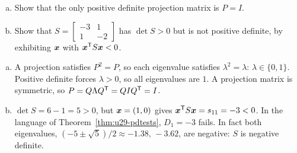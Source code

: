 \begin{exercise}\label{exr:u29-projection}
\begin{enumerate}[(a)]
  \item Show that the only positive definite projection matrix is $P=I$.
  \item Show that $S=\left[\begin{smallmatrix}-3&1\\1&-2\end{smallmatrix}\right]$ has $\det S>0$ but is not
        positive definite, by exhibiting $\boldsymbol{x}$ with $\boldsymbol{x}^{\mathsf{T}} S\boldsymbol{x}<0$.
\end{enumerate}
\end{exercise}
\begin{solution}
\begin{enumerate}[(a)]
  \item A projection satisfies $P^2=P$, so each eigenvalue satisfies $\lambda^2=\lambda$: $\lambda\in\{0,1\}$.
        Positive definite forces $\lambda>0$, so all eigenvalues are $1$. A projection matrix is
        symmetric, so $P=Q\Lambda Q^{\mathsf{T}}=QIQ^{\mathsf{T}}=I$.
  \item $\det S=6-1=5>0$, but $\boldsymbol{x}=(1,0)$ gives $\boldsymbol{x}^{\mathsf{T}} S\boldsymbol{x}=s_{11}=-3<0$. In the language of
        Theorem~\ref{thm:u29-pdtests}, $D_1=-3$ fails. In fact both eigenvalues,
        $(-5\pm\sqrt5)/2\approx-1.38,\,-3.62$, are negative: $S$ is negative definite.
\end{enumerate}
\end{solution}

